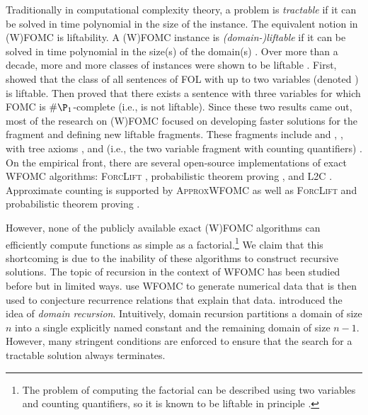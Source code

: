 Traditionally in computational complexity theory, a problem is \emph{tractable}
if it can be solved in time polynomial in the size of the instance. The
equivalent notion in (W)FOMC is liftability. A (W)FOMC instance is
\emph{(domain-)liftable} if it can be solved in time polynomial in the size(s)
of the domain(s) \citep{jaeger2012liftability}. Over more than a decade, more
and more classes of instances were shown to be liftable
\citep{DBLP:conf/kr/BremenK21,DBLP:conf/nips/KazemiKBP16,DBLP:conf/lics/KuusistoL18,DBLP:journals/jair/Kuzelka21}.
First, \citet{DBLP:conf/nips/Broeck11} showed that the class of all sentences of
FOL with up to two variables (denoted \FOtwo{}) is liftable. Then
\citet{DBLP:conf/pods/BeameBGS15} proved that there exists a sentence with three
variables for which FOMC is $\#\P_{1}$-complete (i.e., \FOthree{} is not
liftable). Since these two results came out, most of the research on (W)FOMC
focused on developing faster solutions for the \FOtwo{} fragment
\citep{DBLP:conf/uai/BremenK21,DBLP:conf/aaai/MalhotraS22} and defining
new liftable fragments. These fragments include \SFO{} and \SRU{}
\citep{DBLP:conf/nips/KazemiKBP16}, \Uone{} \citep{DBLP:conf/lics/KuusistoL18},
\FOtwo{} with tree axioms \citep{DBLP:conf/kr/BremenK21}, and \Ctwo{} (i.e., the
two variable fragment with counting quantifiers)
\citep{DBLP:journals/jair/Kuzelka21,DBLP:conf/aaai/MalhotraS22}. On the
empirical front, there are several open-source implementations of exact WFOMC
algorithms: \textsc{ForcLift} \citep{DBLP:conf/ijcai/BroeckTMDR11},
probabilistic theorem proving \citep{DBLP:journals/cacm/GogateD16}, and
\textsc{L2C} \citep{DBLP:conf/kr/KazemiP16}. Approximate counting is supported
by \textsc{ApproxWFOMC} \citep{DBLP:conf/ijcai/BremenK20} as well as
\textsc{ForcLift} \citep{DBLP:conf/uai/BroeckCD12} and probabilistic theorem
proving \citep{DBLP:journals/cacm/GogateD16}.


However, none of the publicly available exact (W)FOMC algorithms can efficiently
compute functions as simple as a factorial.\footnote{The problem of computing
  the factorial can be described using two variables and counting quantifiers,
  so it is known to be liftable in principle
  \citep{DBLP:journals/jair/Kuzelka21}.} We claim that this shortcoming is due
to the inability of these algorithms to construct recursive solutions. The topic
of recursion in the context of WFOMC has been studied before but in limited
ways.  use WFOMC to generate numerical data
that is then used to conjecture recurrence relations that explain that data.
 introduced the idea of \emph{domain recursion}.
Intuitively, domain recursion partitions a domain of size $n$ into a single
explicitly named constant and the remaining domain of size $n-1$. However, many
stringent conditions are enforced to ensure that the search for a tractable
solution always terminates.

